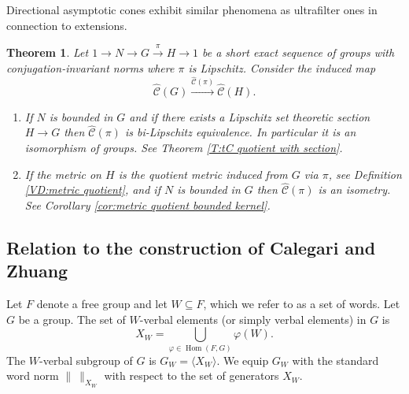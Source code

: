 \documentclass[12pt]{amsart}
\newtheorem{theorem}[prop]{Theorem}
\theoremstyle{definition}
\newcommand{\xto}[1]{\xrightarrow{#1}}
\newcommand{\OP}[1]{\operatorname{#1}}
\def\tC{\hat{\mathcal{C}}}
\begin{document}
Directional asymptotic cones exhibit similar phenomena as ultrafilter ones in connection to extensions.


\begin{theorem}\label{thm:intro extensions}
Let $1 \to N \to G \xto{\pi} H \to 1$ be a short exact sequence of groups with conjugation-invariant norms where $\pi$ is Lipschitz. %
Consider the induced map
\[
\tC(G) \xrightarrow{\tC(\pi)} \tC(H).
\]
\begin{enumerate}[label=(\alph*)]
\item
If $N$ is bounded in $G$ and if there exists a Lipschitz set theoretic section $H \to G$ then  $\tC(\pi)$ is bi-Lipschitz equivalence.
In particular it is an isomorphism of groups.
See Theorem \ref{T:tC quotient with section}.

\item
If the metric on $H$ is the quotient metric induced from $G$ via $\pi$, see Definition \ref{VD:metric quotient}, and if $N$ is bounded in $G$ then $\tC(\pi)$ is an isometry.
See Corollary \ref{cor:metric quotient bounded kernel}.
\end{enumerate}
\end{theorem}







\subsection{Relation to the construction of Calegari and Zhuang} 

Let $F$ denote a free group and let $W \subseteq F$, which we refer to as a set of words.
Let $G$ be a group.
The set of $W$-verbal elements (or simply verbal elements) in $G$ is 
\[
X_W = \bigcup_{\varphi \in \OP{Hom}(F,G)} \varphi(W).
\]
The $W$-verbal subgroup of $G$ is $G_W = \langle X_W \rangle$.
We equip $G_W$ with the standard word norm $\| \ \|_{X_W}$ with respect to the set of generators $X_W$.
\end{document}
